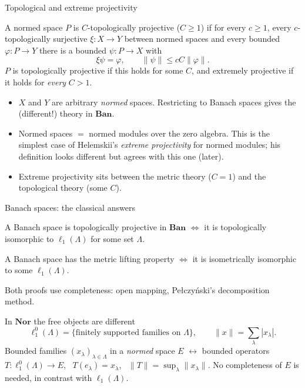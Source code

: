 \documentclass[10pt,aspectratio=169]{beamer}
\newcommand{\Nor}{\mathbf{Nor}}
\newcommand{\Ban}{\mathbf{Ban}}
\newcommand{\lo}[1]{\ell_1^0(#1)}
\newcommand{\ellone}[1]{\ell_1(#1)}
\begin{document}
\begin{frame}{Topological and extreme projectivity}
  \begin{definition}
    A normed space $P$ is \alert{$C$-topologically projective} ($C\ge1$) if for
    every $c\ge1$, every $c$-topologically surjective $\xi\colon X\to Y$ between
    normed spaces and every bounded $\varphi\colon P\to Y$ there is a bounded
    $\psi\colon P\to X$ with
    \[
      \xi\psi=\varphi,\qquad \|\psi\|\le cC\|\varphi\| .
    \]
    $P$ is \alert{topologically projective} if this holds for some $C$, and
    \alert{extremely projective} if it holds for \emph{every} $C>1$.
  \end{definition}
  \begin{itemize}
    \item $X$ and $Y$ are arbitrary \emph{normed} spaces. Restricting to Banach
      spaces gives the (different!) theory in $\Ban$.
    \item Normed spaces $=$ normed modules over the zero algebra. This is the
      simplest case of Helemskii's \emph{extreme projectivity} for normed modules;
      his definition looks different but agrees with this one (later).
    \item Extreme projectivity sits between the metric theory ($C=1$) and the
      topological theory (some $C$).
  \end{itemize}
\end{frame}

\begin{frame}{Banach spaces: the classical answers}
  \begin{theorem}[K\"othe 1966]
    A Banach space is topologically projective in $\Ban$ $\iff$ it is
    topologically isomorphic to $\ellone\Lambda$ for some set $\Lambda$.
  \end{theorem}
  \begin{theorem}[Grothendieck 1955]
    A Banach space has the metric lifting property $\iff$ it is isometrically
    isomorphic to some $\ellone\Lambda$.
  \end{theorem}
  Both proofs use completeness: open mapping, Pe{\l}czy\'nski's decomposition method.
  \begin{alertblock}{In $\Nor$ the free objects are different}
    \[
      \lo\Lambda=\{\text{finitely supported families on }\Lambda\},\qquad
      \|x\|=\sum_\lambda|x_\lambda| .
    \]
    Bounded families ${(x_\lambda)}_{\lambda\in\Lambda}$ in a \emph{normed} space $E$
    $\leftrightarrow$ bounded operators $T\colon\lo\Lambda\to E$, \
    $T(e_\lambda)=x_\lambda$, \ $\|T\|=\sup_\lambda\|x_\lambda\|$.
    No completeness of $E$ is needed, in contrast with $\ellone\Lambda$.
  \end{alertblock}
\end{frame}
\end{document}
